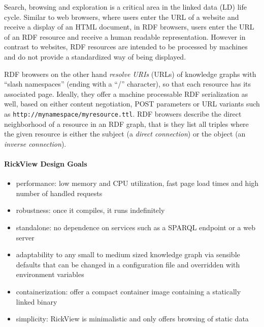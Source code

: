 \documentclass{ceurart}
\begin{document}
Search, browsing and exploration is a critical area in the linked data (LD) life cycle.
Similar to web browsers, where users enter the URL of a website and receive a display of an HTML document, in RDF browsers,
users enter the URL of an RDF resource and receive a human readable representation.
However in contrast to websites, RDF resources are intended to be processed by machines and do not provide a standardized way of being displayed.

RDF browsers on the other hand \emph{resolve URIs} (URLs) of knowledge graphs with \enquote{slash namespaces} (ending with a \enquote{/} character), so that each resource has its associated page.
Ideally, they offer a machine processable RDF serialization as well, based on either content negotiation, POST parameters or URL variants such as \texttt{http://mynamespace/myresource.ttl}.
RDF browsers describe the direct neighborhood of a resource in an RDF graph, that is they list all triples where the given resource is either the subject (a \emph{direct connection}) or the object (an \emph{inverse connection}).

\paragraph{RickView Design Goals}
\begin{itemize}
\item
  performance: low memory and CPU utilization, fast page load times and high number of handled requests
\item
  robustness: once it compiles, it runs indefinitely
\item
  standalone: no dependence on services such as a SPARQL endpoint or a web server
\item
  adaptability to any small to medium sized knowledge graph via sensible defaults that can be changed in a configuration file and overridden with environment variables
\item
  containerization: offer a compact container image containing a statically linked binary
\item
  simplicity: RickView is minimalistic and only offers browsing of static data
\end{itemize}
\end{document}
